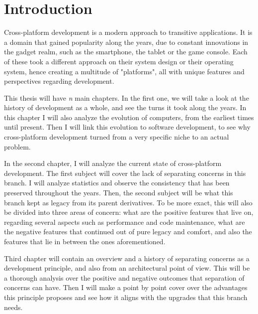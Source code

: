 \chapter{Introduction}

\label{intro}


Cross-platform development is a modern approach to transitive applications.
It is a domain that gained popularity along the years, due to constant innovations in the gadget realm, such as the smartphone, the tablet or the game console.
Each of these took a different approach on their system design or their operating system, hence creating a multitude of "platforms", all with unique features and perspectives regarding development.
\par
This thesis will have \textit{n} main chapters.
In the first one, we will take a look at the history of development as a whole, and see the turns it took along the years.
In this chapter I will also analyze the evolution of computers, from the earliest times until present.
Then I will link this evolution to software development, to see why cross-platform development turned from a very specific niche to an actual problem.
\par
In the second chapter, I will analyze the current state of cross-platform development.
The first subject will cover the lack of separating concerns in this branch.
I will analyze statistics and observe the consistency that has been preserved throughout the years.
Then, the second subject will be what this branch kept as legacy from its parent derivatives.
To be more exact, this will also be divided into three areas of concern: what are the positive features that live on, regarding several aspects such as performance and code maintenance, what are the negative features that continued out of pure legacy and comfort, and also the features that lie in between the ones aforementioned.
\par
Third chapter will contain an overview and a history of separating concerns as a development principle, and also from an architectural point of view.
This will be a thorough analysis over the positive and negative outcomes that separation of concerns can have.
Then I will make a point by point cover over the advantages this principle proposes and see how it aligns with the upgrades that this branch needs.
\par
